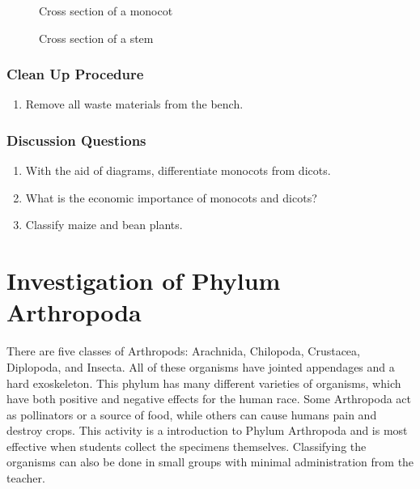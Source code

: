 \begin{figure}[h]
\begin{center}
\def\svgwidth{6cm}

\caption{Cross section of a monocot}
\label{fig:monoroot}
\end{center}
\end{figure}

\begin{figure}[h]
\begin{center}
\def\svgwidth{6cm}

\caption{Cross section of a stem}
\label{fig:monostem}
\end{center}
\end{figure}

\subsubsection*{Clean Up Procedure}
\begin{enumerate}
\item{Remove all waste materials from the bench.}
\end{enumerate}

\subsubsection*{Discussion Questions}
\begin{enumerate}
\item{With the aid of diagrams, differentiate monocots from dicots.}
\item{What is the economic importance of monocots and dicots?}
\item{Classify maize and bean plants.}
\end{enumerate}


\section{Investigation of Phylum Arthropoda}
There are five classes of Arthropods: Arachnida, Chilopoda, Crustacea, Diplopoda, and Insecta. All of these organisms have jointed appendages and a hard exoskeleton. This phylum has many different varieties of organisms, which have both positive and negative effects for the human race.  Some Arthropoda act as pollinators or a source of food, while others can cause humans pain and destroy crops.
This activity is a introduction to Phylum Arthropoda and is most effective when students collect the specimens themselves.  Classifying the organisms can also be done in small groups with minimal administration from the teacher.

